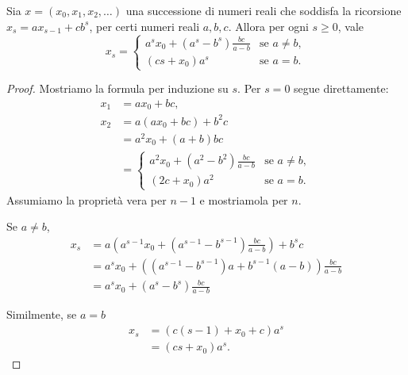 \begin{lemma}
	\label{lemma:rec_relation_ab}
	Sia $ x = \left( x_0, x_1, x_2,\ldots \right) $ una successione di numeri reali che soddisfa la
	ricorsione $ x_s = ax_{s-1} + cb^s $, per certi numeri reali $ a,b,c $. Allora per ogni $ s \ge 0
	$, vale
	\begin{equation*}
		x_s = \begin{cases}
			a^s x_0 + (a^s - b^s) \frac{bc}{a-b} & \text{se } a\neq b, \\
			(cs + x_0)a^s                        & \text{se } a = b.
		\end{cases}
	\end{equation*}
\end{lemma}
\begin{proof}
	Mostriamo la formula per induzione su $ s $. Per $ s=0 $ segue direttamente:
	\begin{equation*}
		\begin{aligned}
			x_1 & = ax_0 + bc,                                               \\
			x_2 & = a(ax_0 + bc) + b^2 c                                     \\
			    & = a^2 x_0 + (a + b)bc                                      \\
			    & = \begin{cases}
				        a^2x_0 + (a^2 - b^2)\frac{bc}{a-b} & \text{se } a\neq b, \\
				        (2c + x_0)a^2                      & \text{se } a=b.
			        \end{cases}
		\end{aligned}
	\end{equation*}
	Assumiamo la proprietà vera per $ n-1 $ e mostriamola per $ n $.

	Se $ a \neq b $,
	\begin{equation*}
		\begin{aligned}
			x_s & = a\left(a^{s-1}x_0 + \left(a^{s-1} - b^{s-1}\right) \frac{bc}{a-b}\right) + b^sc \\
			    & = a^s x_0 + \left( (a^{s-1} - b^{s-1})a + b^{s-1}(a-b) \right)\frac{bc}{a-b}      \\
			    & = a^s x_0 + \left(a^{s}-b^{s} \right)\frac{bc}{a-b}
		\end{aligned}
	\end{equation*}

	Similmente, se $ a = b $
	\begin{equation*}
		\begin{aligned}
			x_s & = \left( c(s-1) + x_0 + c \right)a^s \\
			    & =  (cs + x_0)a^s.
		\end{aligned}
	\end{equation*}
\end{proof}

